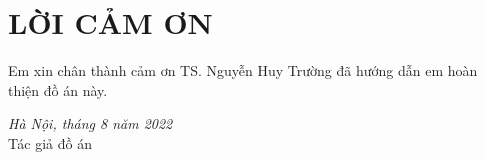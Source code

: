 \documentclass{report}
\begin{document}


\newpage
\thispagestyle{empty}


\newpage


\section*{LỜI CẢM ƠN}
Em xin chân thành cảm ơn TS. Nguyễn Huy Trường đã hướng dẫn em hoàn thiện đồ án này. 

\hspace{0.5\textwidth}
\begin{minipage}{0.5\textwidth}
\noindent\begin{center}
\vspace{2cm}
\textit{Hà Nội, tháng 8 năm 2022} \\
Tác giả đồ án\\ \vspace{2.5cm}
\end{center}	
\end{minipage}
\newpage

\tableofcontents %
\newpage



\newpage

\end{document}
